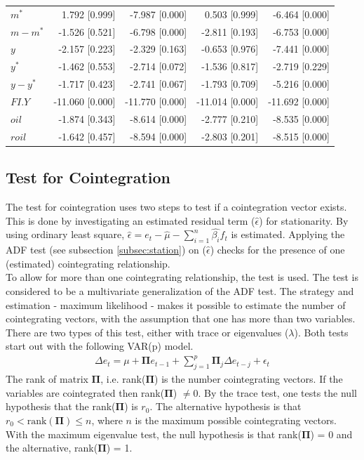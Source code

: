 \documentclass[10pt]{article}
\numberwithin{equation}{section}
\numberwithin{table}{section}
\numberwithin{figure}{section}
\begin{document}
\begin{spacing}{1.5}
\begin{tabularx}{\textwidth}{lrrrr}
$m^*$ & 1.792 [0.999] & -7.987 [0.000] & 0.503 [0.999] & -6.464 [0.000] \\
$m-m^*$ & -1.526 [0.521] & -6.798 [0.000] & -2.811 [0.193] & -6.753 [0.000] \\
$y$   & -2.157 [0.223] & -2.329 [0.163] & -0.653 [0.976] & -7.441 [0.000] \\
$y^*$ & -1.462 [0.553] & -2.714 [0.072] & -1.536 [0.817] & -2.719 [0.229] \\
$y-y^*$ & -1.717 [0.423] & -2.741 [0.067] & -1.793 [0.709] & -5.216 [0.000] \\
$FI.Y$ & -11.060 [0.000] & -11.770 [0.000] & -11.014 [0.000] & -11.692 [0.000] \\
$oil$ & -1.874 [0.343] & -8.614 [0.000] & -2.777 [0.210] & -8.535 [0.000] \\
$roil$ & -1.642 [0.457] & -8.594 [0.000] & -2.803 [0.201] & -8.515 [0.000] \\
\midrule
\end{tabularx}
\vspace*{-0,6cm}\parnotes

\newpage
\subsection{Test for Cointegration}
\label{subsec:coint}
\small
\noindent The \cite{engle1987co} test for cointegration uses two steps to test if a cointegration vector exists. This is done by investigating an estimated residual term ($\hat{\epsilon}$) for stationarity. By using ordinary least square, $\hat{\epsilon} = e_t - \hat{\mu} - \sum_{i=1}^n\hat{\beta_i}f_t$ is estimated. Applying the ADF test (see subsection \ref{subsec:station}) on ($\hat{\epsilon}$) checks for the presence of one (estimated) cointegrating relationship.\\
\indent To allow for more than one cointegrating relationship, the \cite{johansen1991estimation} test is used. The test is considered to be a multivariate generalization of the ADF test. The strategy and estimation - maximum likelihood - makes it possible to estimate the number of cointegrating vectors, with the assumption that one has more than two variables. There are two types of this test, either with trace or eigenvalues ($\lambda$). Both tests start out with the following VAR(p) model.
\begin{align}
    \Delta e_t = \mu + \mathbf{\Pi}e_{t-1} + \sum_{j=1}^p\mathbf{\Pi}_j\Delta e_{t-j}+\epsilon_t
\end{align}
\noindent The rank of matrix $\mathbf{\Pi}$, i.e. rank($\mathbf{\Pi}$) is the number cointegrating vectors. If the variables are cointegrated then rank($\mathbf{\Pi}$) $\neq 0$. By the trace test, one tests the null hypothesis that the rank($\mathbf{\Pi}$) is $r_0$. The alternative hypothesis is that $r_0 < \text{rank}(\mathbf{\Pi}) \leq n$, where $n$ is the maximum possible cointegrating vectors. With the maximum eigenvalue test, the null hypothesis is that rank($\mathbf{\Pi}$) = 0 and the alternative, rank($\mathbf{\Pi}$) = 1.\\


\end{spacing}
\end{document}

